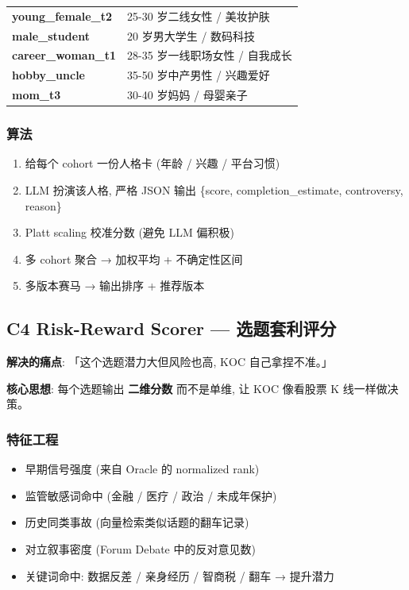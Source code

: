 \begin{tabularx}{\textwidth}{>{\bfseries}l X}
    \toprule
    young\_female\_t2 & 25-30 岁二线女性 / 美妆护肤 \\
    male\_student & 20 岁男大学生 / 数码科技 \\
    career\_woman\_t1 & 28-35 岁一线职场女性 / 自我成长 \\
    hobby\_uncle & 35-50 岁中产男性 / 兴趣爱好 \\
    mom\_t3 & 30-40 岁妈妈 / 母婴亲子 \\
    \bottomrule
\end{tabularx}

\subsubsection{算法}

\begin{enumerate}
    \item 给每个 cohort 一份人格卡 (年龄 / 兴趣 / 平台习惯)
    \item LLM 扮演该人格, 严格 JSON 输出 \{score, completion\_estimate, controversy, reason\}
    \item Platt scaling 校准分数 (避免 LLM 偏积极)
    \item 多 cohort 聚合 → 加权平均 + 不确定性区间
    \item 多版本赛马 → 输出排序 + 推荐版本
\end{enumerate}

\subsection{C4 Risk-Reward Scorer — 选题套利评分}

\textbf{解决的痛点}: 「这个选题潜力大但风险也高, KOC 自己拿捏不准。」

\textbf{核心思想}: 每个选题输出 \textbf{二维分数} 而不是单维, 让 KOC 像看股票 K 线一样做决策。

\subsubsection{特征工程}

\begin{itemize}
    \item 早期信号强度 (来自 Oracle 的 normalized rank)
    \item 监管敏感词命中 (金融 / 医疗 / 政治 / 未成年保护)
    \item 历史同类事故 (向量检索类似话题的翻车记录)
    \item 对立叙事密度 (Forum Debate 中的反对意见数)
    \item 关键词命中: 数据反差 / 亲身经历 / 智商税 / 翻车 → 提升潜力
\end{itemize}

